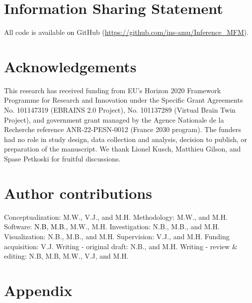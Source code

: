\documentclass[12pt]{article}
\begin{document}
\section*{Information Sharing Statement}

All code is available \textcolor{black}{on} GitHub (\url{https://github.com/ins-amu/Inference_MFM}).

\section*{Acknowledgements}

This research has received funding from EU's Horizon 2020 Framework Programme for Research and Innovation under the Specific Grant Agreements No. 101147319 (EBRAINS 2.0 Project),  No. 101137289 (Virtual Brain Twin Project), and government grant managed by the Agence Nationale de la Recherche reference ANR-22-PESN-0012 (France 2030 program). The funders had no role in study design, data collection and analysis, decision to publish, or preparation of the manuscript. We thank Lionel Kusch, Matthieu Gilson, and Spase Petkoski for fruitful discussions.

\section*{Author contributions}

Conceptualization: M.W., V.J., and M.H. Methodology: M.W., and M.H.  Software: \textcolor{black}{N.B, M.B.,} M.W., M.H.  Investigation: N.B., M.B., and M.H. Visualization: N.B., M.B., and M.H. Supervision: V.J., and  M.H. Funding acquisition: V.J. Writing - original draft: N.B., and M.H. Writing - review $\&$ editing: N.B, M.B,  M.W., V.J, and M.H.



\clearpage   

\setcounter{figure}{0}

\section*{Appendix}
\end{document}
